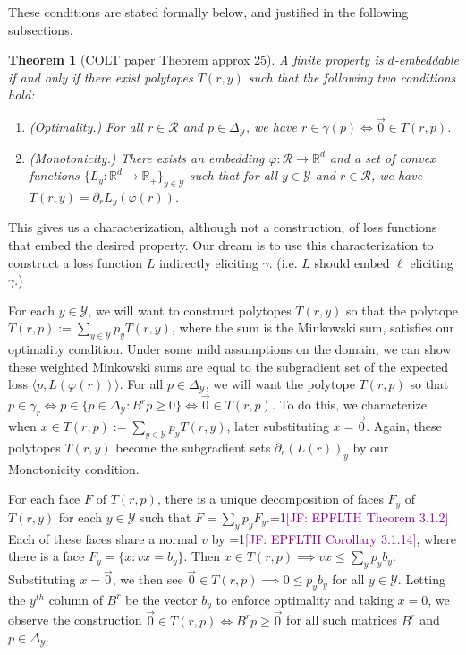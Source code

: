 \documentclass[12pt]{article}
\newcommand{\Comments}{1}
\newcommand{\mynote}[2]{\ifnum\Comments=1\textcolor{#1}{#2}\fi}
\newcommand{\jessie}[1]{\mynote{purple}{[JF: #1]}}
\newcommand{\reals}{\mathbb{R}}
\newcommand{\simplex}{\Delta_\Y}
\newcommand{\R}{\mathcal{R}}
\newcommand{\Y}{\mathcal{Y}}
\newcommand{\inprod}[2]{\langle #1, #2 \rangle}%
\newtheorem{theorem}{Theorem}
\begin{document}
These conditions are stated formally below, and justified in the following subsections.
\begin{theorem}[COLT paper Theorem approx 25]
A finite property is $d$-embeddable if and only if there exist polytopes $T(r,y)$ such that the following two conditions hold:
\begin{enumerate}
	\item (Optimality.) For all $r \in \R$ and $p \in \simplex$, we have $r \in \gamma(p) \iff \vec 0 \in T(r,p)$.
	\item (Monotonicity.) There exists an embedding $\varphi:\R \to \reals^d$ and a set of convex functions $\{L_y: \reals^d \to \reals_+\}_{y \in \Y}$ such that for all $y \in \Y$ and $r \in \R$, we have $T(r,y) = \partial_r L_y(\varphi(r))$.
\end{enumerate}
\end{theorem}


This gives us a characterization, although not a construction, of loss functions that embed the desired property.
Our dream is to use this characterization to construct a loss function $L$ indirectly eliciting $\gamma$.  (i.e. $L$ should embed $\ell$ eliciting $\gamma$.)

For each $y \in \Y$, we will want to construct polytopes $T(r,y)$ so that the polytope $T(r,p) := \sum_{y \in \Y} p_y T(r,y)$, where the sum is the Minkowski sum, satisfies our optimality condition.
Under some mild assumptions on the domain, we can show these weighted Minkowski sums are equal to the subgradient set of the expected loss $\inprod{p}{L(\varphi(r))}$.
For all $p \in \simplex$, we will want the polytope $T(r,p)$ so that $p \in \gamma_r \iff p \in \{p \in \simplex : B^r p \geq 0\} \iff \vec 0 \in T(r,p)$.
To do this, we characterize when $x \in T(r,p) := \sum_{y \in \Y} p_y T(r,y)$, later substituting $x = \vec 0$.
Again, these polytopes $T(r,y)$ become the subgradient sets $\partial_r (L(r))_y$ by our Monotonicity condition.


For each face $F$ of $T(r,p)$, there is a unique decomposition of faces $F_y$ of $T(r,y)$ for each $y \in \Y$ such that $F = \sum_y p_y F_y$.\jessie{EPFLTH Theorem 3.1.2}
Each of these faces share a normal $v$ by \jessie{EPFLTH Corollary 3.1.14}, where there is a face $F_y = \{x : vx = b_y\}$.
Then $x \in T(r,p) \implies v x \leq \sum_y p_y b_y$.
Substituting $x = \vec 0$, we then see $\vec 0 \in T(r,p) \implies 0 \leq p_y b_y$ for all $y \in \Y$.
Letting the $y^{th}$ column of $B^r$ be the vector $b_y$ to enforce optimality and taking $x = 0$, we observe the construction $\vec 0 \in T(r,p) \iff B^rp \geq \vec 0$ for all such matrices $B^r$ and $p \in \simplex$.
\end{document}
